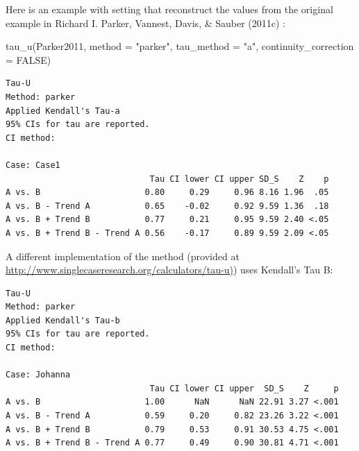 \documentclass[
  letterpaper,
  DIV=11,
  numbers=noendperiod]{scrreprt}
\newenvironment{Shaded}{\begin{snugshade}}{\end{snugshade}}
\newcommand{\AttributeTok}[1]{\textcolor[rgb]{0.40,0.45,0.13}{#1}}
\newcommand{\ConstantTok}[1]{\textcolor[rgb]{0.56,0.35,0.01}{#1}}
\newcommand{\FunctionTok}[1]{\textcolor[rgb]{0.28,0.35,0.67}{#1}}
\newcommand{\NormalTok}[1]{\textcolor[rgb]{0.00,0.23,0.31}{#1}}
\newcommand{\SpecialCharTok}[1]{\textcolor[rgb]{0.37,0.37,0.37}{#1}}
\newcommand{\StringTok}[1]{\textcolor[rgb]{0.13,0.47,0.30}{#1}}
\begin{document}
Here is an example with setting that reconstruct the values from the
original example in Richard I. Parker, Vannest, Davis, \& Sauber (2011c)
:

\begin{Shaded}
\begin{Highlighting}[]
\FunctionTok{tau\_u}\NormalTok{(Parker2011, }\AttributeTok{method =} \StringTok{"parker"}\NormalTok{, }\AttributeTok{tau\_method =} \StringTok{"a"}\NormalTok{, }\AttributeTok{continuity\_correction =} \ConstantTok{FALSE}\NormalTok{)}
\end{Highlighting}
\end{Shaded}

\begin{verbatim}
Tau-U
Method: parker 
Applied Kendall's Tau-a
95% CIs for tau are reported.
CI method: 

Case: Case1 
                             Tau CI lower CI upper SD_S    Z    p
A vs. B                     0.80     0.29     0.96 8.16 1.96  .05
A vs. B - Trend A           0.65    -0.02     0.92 9.59 1.36  .18
A vs. B + Trend B           0.77     0.21     0.95 9.59 2.40 <.05
A vs. B + Trend B - Trend A 0.56    -0.17     0.89 9.59 2.09 <.05
\end{verbatim}

A different implementation of the method (provided at
\href{http://www.singlecaseresearch.org/calculators/tau-u}{http://www.singlecaseresearch.org/calculators/tau-u)})
uses Kendall's Tau B:

\begin{Shaded}
\end{Shaded}

\begin{verbatim}
Tau-U
Method: parker 
Applied Kendall's Tau-b
95% CIs for tau are reported.
CI method: 

Case: Johanna 
                             Tau CI lower CI upper  SD_S    Z     p
A vs. B                     1.00      NaN      NaN 22.91 3.27 <.001
A vs. B - Trend A           0.59     0.20     0.82 23.26 3.22 <.001
A vs. B + Trend B           0.79     0.53     0.91 30.53 4.75 <.001
A vs. B + Trend B - Trend A 0.77     0.49     0.90 30.81 4.71 <.001
\end{verbatim}
\end{document}
